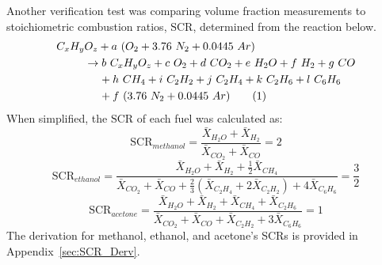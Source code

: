 \documentclass[12pt]{article}
\newcommand\numberthis{\addtocounter{equation}{1}\tag{\theequation}}
\begin{document}
Another verification test was comparing volume fraction measurements to stoichiometric combustion ratios, $\text{SCR}$, determined from the reaction below.
\begin{align*}
C_{x}H_{y}&O_{z}+a~(O_{2}+3.76~N_{2}+0.0445~Ar)\\
&\rightarrow b~C_{x}H_{y}O_{z}+c~O_{2}+ d~CO_{2}+e~H_{2}O+f~H_{2}+ g~CO\\
&~~~~+h~CH_{4}+ i~C_{2}H_{2}+j~C_{2}H_{4}+k~C_{2}H_{6}+l~C_{6}H_{6}\\
&~~~~+f~(3.76~N_{2}+0.0445~Ar) \numberthis \label{eq:Ideal_rxn}
\end{align*}
When simplified, the $\text{SCR}$ of each fuel was calculated as:
\begin{equation}\label{eq:prod_ratio_methanol}
 \text{SCR}_{methanol}=\frac{\bar{X}_{H_2O}+\bar{X}_{H_2}}{\bar{X}_{CO_2}+\bar{X}_{CO}}=2
\end{equation}
\begin{equation}\label{eq:prod_ratio_ethanol}
\text{SCR}_{ethanol}=\frac{\bar{X}_{H_2O}+\bar{X}_{H_2}+\frac{1}{2}\bar{X}_{CH_4}}{\bar{X}_{CO_2}+\bar{X}_{CO}+\frac{2}{3}(\bar{X}_{C_2H_4}+2\bar{X}_{C_2H_2})+4\bar{X}_{C_6H_6}}=\frac{3}{2}
\end{equation}
\begin{equation}\label{eq:prod_ratio_acetone}
\text{SCR}_{acetone}=\frac{\bar{X}_{H_2O}+\bar{X}_{H_2}+\bar{X}_{CH_4}+\bar{X}_{C_2H_6}}{\bar{X}_{CO_2}+\bar{X}_{CO}+\bar{X}_{C_2H_2}+3\bar{X}_{C_6H_6}}=1
\end{equation}
The derivation for methanol, ethanol, and acetone's SCRs is provided in Appendix~\ref{sec:SCR_Derv}.
\end{document}
